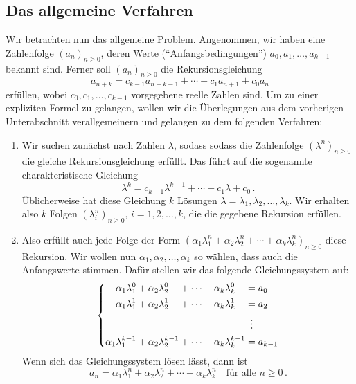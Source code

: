 \subsection*{Das allgemeine Verfahren}
Wir betrachten nun das allgemeine Problem. Angenommen, wir haben eine Zahlenfolge $(a_n)_{n\geqslant 0}$, deren Werte (\enquote{Anfangsbedingungen}) $a_0,a_1,\dotsc,a_{k-1}$ bekannt sind. Ferner soll $(a_n)_{n\geqslant 0}$ die Rekursionsgleichung
\begin{equation*}
	a_{n+k}=c_{k-1}a_{n+k-1}+\dotsb+c_1a_{n+1}+c_0a_n
\end{equation*}
erfüllen, wobei $c_0,c_1,\dotsc,c_{k-1}$ vorgegebene reelle Zahlen sind. Um zu einer expliziten Formel zu gelangen, wollen wir die Überlegungen aus dem vorherigen Unterabschnitt verallgemeinern und gelangen zu dem folgenden Verfahren:
\begin{enumerate}\itshape
	\item \label{itm:CharakteristischesPolynom}Wir suchen zunächst nach Zahlen $\lambda$, sodass sodass die Zahlenfolge $(\lambda^n)_{n\geqslant 0}$ die gleiche Rekursionsgleichung erfüllt. Das führt auf die sogenannte charakteristische Gleichung
	\begin{equation*}
		\lambda^{k}=c_{k-1}\lambda^{k-1}+\dotsb+c_1\lambda+c_0\,.
	\end{equation*}
	Üblicherweise hat diese Gleichung $k$ Lösungen $\lambda=\lambda_1,\lambda_2,\dotsc,\lambda_k$. Wir erhalten also $k$ Folgen $(\lambda_i^n)_{n\geqslant 0}$, $i=1,2,\dotsc,k$, die die gegebene Rekursion erfüllen.
	\item \label{itm:RekursionGleichungssystem}Also erfüllt auch jede Folge der Form $(\alpha_1\lambda_1^n+\alpha_2\lambda_2^n+\dotsb+\alpha_k\lambda_k^n)_{n\geqslant 0}$ diese Rekursion. Wir wollen nun $\alpha_1,\alpha_2,\dotsc,\alpha_k$ so wählen, dass auch die Anfangswerte stimmen. Dafür stellen wir das folgende Gleichungssystem auf:
	\newlength{\lengthofequals}
	\settowidth{\lengthofequals}{$=$}
	\begin{equation*}
		\left\{\begin{alignedat}{5}
			\alpha_1\lambda_1^0&+\alpha_2\lambda_2^0&&+\dotsb&&+\alpha_k\lambda_k^0&&=a_0\\
			\alpha_1\lambda_1^1&+\alpha_2\lambda_2^1&&+\dotsb&&+\alpha_k\lambda_k^1&&=a_2\\
			&&&&&&&\mathrel{\tikz[inner sep=0,outer sep=0]{\node at (0,-0.5ex) {$\phantom{=}$};\node at (0,0) {$\vdots$};}}\\
			\alpha_1\lambda_1^{k-1}&+\alpha_2\lambda_2^{k-1}&&+\dotsb&&+\alpha_k\lambda_k^{k-1}&&=a_{k-1}\\
		\end{alignedat}\right.
	\end{equation*}
	Wenn sich das Gleichungssystem lösen lässt, dann ist
	\begin{equation*}
		a_n=\alpha_1\lambda_1^n+\alpha_2\lambda_2^n+\dotsb+\alpha_k\lambda_k^n\quad\text{für alle }n\geqslant 0\,.
	\end{equation*}
\end{enumerate}
